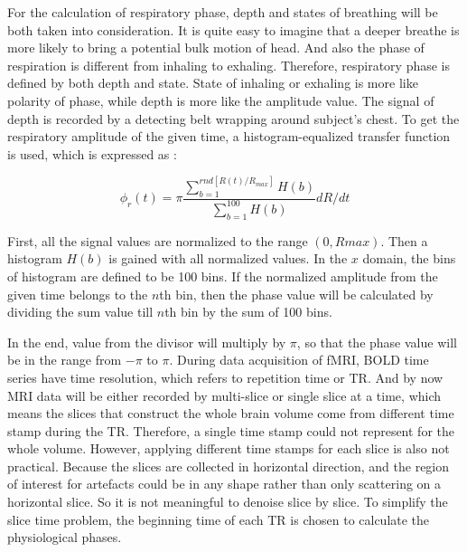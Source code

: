 For the calculation of respiratory phase, depth and states of breathing will be both taken into consideration. 
It is quite easy to imagine that a deeper breathe is more likely to bring a potential bulk motion of head. 
And also the phase of respiration is different from inhaling to exhaling. 
Therefore, respiratory phase is defined by both depth and state. 
State of inhaling or exhaling is more like polarity of phase, while depth is more like the amplitude value. 
The signal of depth is recorded by a detecting belt wrapping around subject's chest. 
To get the respiratory amplitude of the given time, a histogram-equalized transfer function is used, which is expressed  as :

\begin{equation}
    \phi_r(t) = \pi \frac{\sum_{b=1}^{rnd[R(t)/R_{max}]}H(b)}{\sum_{b=1}^{100}H(b)}dR/dt
\end{equation}

First, all the signal values are normalized to the range $(0, Rmax)$. Then a histogram $H(b)$ is gained with all normalized values. 
In the $x$ domain, the bins of histogram are defined to be 100 bins. 
If the normalized amplitude from the given time belongs to the $n$th bin, 
then the phase value will be calculated by dividing the sum value till $n$th bin by the sum of 100 bins.

In the end, value from the divisor will multiply by $\pi$, so that the phase value will be in the range from $-\pi$ to $\pi$.
During data acquisition of fMRI, BOLD time series have time resolution, which refers to repetition time or TR. 
And by now MRI data will be either recorded by multi-slice or single slice at a time, which means the slices that construct the whole brain volume come from different time stamp during the TR. 
Therefore, a single time stamp could not represent for the whole volume. 
However, applying different time stamps for each slice is also not practical. 
Because the slices are collected in horizontal direction, and the region of interest for artefacts could be in any shape rather than only scattering on a horizontal slice. 
So it is not meaningful to denoise slice by slice.
To simplify the slice time problem, the beginning time of each TR is chosen to calculate the physiological phases.